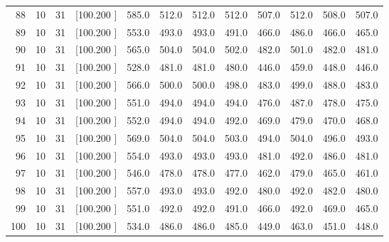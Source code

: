 \documentclass[12pt,a4paper]{article}
\begin{document}
\begin{center}
{\begin{tabular}{r r r r r r r r r r r r}
  88& 10& 31&[100.200   ]&   585.0&   512.0&   512.0&   512.0&   507.0&   512.0&   508.0&   507.0\\[-0.02in]
  89& 10& 31&[100.200   ]&   553.0&   493.0&   493.0&   491.0&   466.0&   486.0&   466.0&   465.0\\[-0.02in]
  90& 10& 31&[100.200   ]&   565.0&   504.0&   504.0&   502.0&   482.0&   501.0&   482.0&   481.0\\[-0.02in]
  91& 10& 31&[100.200   ]&   528.0&   481.0&   481.0&   480.0&   446.0&   459.0&   448.0&   446.0\\[-0.02in]
  92& 10& 31&[100.200   ]&   566.0&   500.0&   500.0&   498.0&   483.0&   499.0&   488.0&   483.0\\[-0.02in]
  93& 10& 31&[100.200   ]&   551.0&   494.0&   494.0&   494.0&   476.0&   487.0&   478.0&   475.0\\[-0.02in]
  94& 10& 31&[100.200   ]&   552.0&   494.0&   494.0&   492.0&   469.0&   479.0&   470.0&   468.0\\[-0.02in]
  95& 10& 31&[100.200   ]&   569.0&   504.0&   504.0&   503.0&   494.0&   504.0&   496.0&   493.0\\[-0.02in]
  96& 10& 31&[100.200   ]&   554.0&   493.0&   493.0&   493.0&   481.0&   492.0&   486.0&   481.0\\[-0.02in]
  97& 10& 31&[100.200   ]&   546.0&   478.0&   478.0&   477.0&   462.0&   479.0&   465.0&   461.0\\[-0.02in]
  98& 10& 31&[100.200   ]&   557.0&   493.0&   493.0&   492.0&   480.0&   492.0&   482.0&   480.0\\[-0.02in]
  99& 10& 31&[100.200   ]&   551.0&   492.0&   492.0&   491.0&   466.0&   492.0&   469.0&   465.0\\[-0.02in]
 100& 10& 31&[100.200   ]&   534.0&   486.0&   486.0&   485.0&   449.0&   463.0&   451.0&   448.0\\[-0.02in]

\hline
\end{tabular}}
\end{center}
\end{document}
